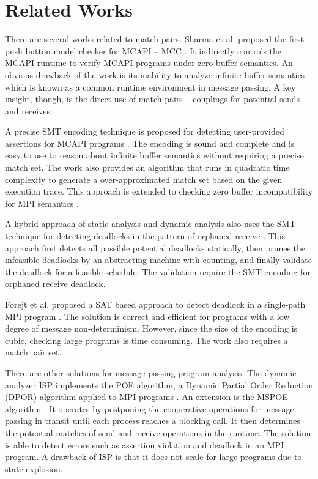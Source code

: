\section{Related Works}
There are several works related to match pairs.
Sharma et al. proposed the first push button model checker for MCAPI -- MCC \cite{DBLP:conf/fmcad/SharmaGMH09}. It indirectly controls the MCAPI runtime to verify MCAPI programs under zero buffer semantics. An obvious drawback of the work is its inability to analyze infinite buffer semantics which is known as a common runtime environment in message passing. A key insight, though, is the direct use of match pairs -- couplings for potential sends and receives.

A precise SMT encoding technique is proposed for detecting user-provided assertions for MCAPI programs \cite{DBLP:conf/kbse/HuangMM13}. The encoding is sound and complete and is easy to use to reason about infinite buffer semantics without requiring a precise match set. The work also provides an algorithm that runs in quadratic time complexity to generate a over-approximated match set based on the given execution trace. This approach is extended to checking zero buffer incompatibility for MPI semantics \cite{HuangNFM15}. 

A hybrid approach of static analysis and dynamic analysis also uses the SMT technique for detecting deadlocks in the pattern of orphaned receive \cite{HuangDeadlock}. This approach first detects all possible potential deadlocks statically, then prunes the infeasible deadlocks by an abstracting machine with counting, and finally validate the deadlock for a feasible schedule. The validation require the SMT encoding for orphaned receive deadlock. 

Forejt et al. proposed a SAT based approach to detect deadlock in a single-path MPI program \cite{DBLP:conf/fm/ForejtKNS14}. The solution is correct and efficient for programs with a low degree of message non-determinism. However, since the size of the encoding is cubic, checking large programs is time consuming. The work also requires a match pair set.

There are other solutions for message passing program analysis.
The dynamic analyzer ISP implements the POE algorithm, a Dynamic Partial Order Reduction (DPOR) algorithm \cite{DBLP:conf/popl/FlanaganG05} applied to MPI programs \cite{DBLP:conf/ppopp/VakkalankaSGK08}. 
An extension is the MSPOE algorithm \cite{DBLP:conf/sbmf/SharmaGB12}. It operates by postponing the cooperative operations for message passing in transit until each process reaches a blocking call. It then determines the potential matches of send and receive operations in the runtime. The solution is able to detect errors such as assertion violation and deadlock in an MPI program.
A drawback of ISP is that it does not scale for large programs due to state explosion.

